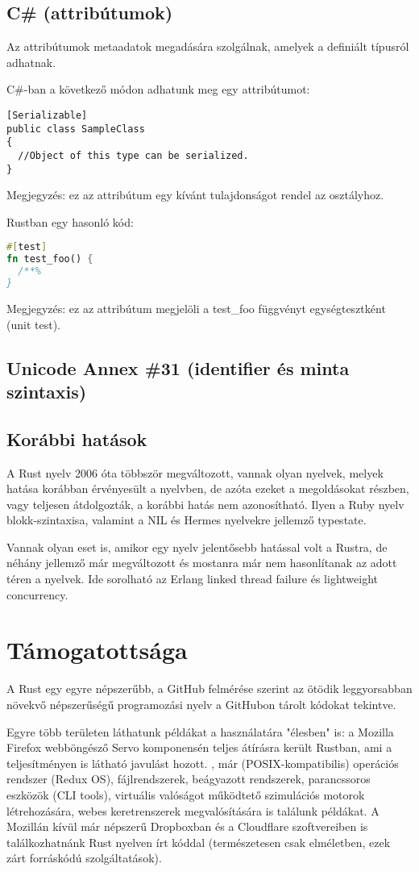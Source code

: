 \subsection{C\# (attribútumok)}

Az attribútumok metaadatok megadására szolgálnak, amelyek a definiált típusról adhatnak.

C\#-ban a következő módon adhatunk meg egy attribútumot:
\begin{lstlisting}
[Serializable]
public class SampleClass
{
  //Object of this type can be serialized.
}
\end{lstlisting}
Megjegyzés: ez az attribútum egy kívánt tulajdonságot rendel az osztályhoz.

Rustban egy hasonló kód:
\begin{lstlisting}[language=Rust, style=boxed]
#[test]
fn test_foo() {
  /**%
}
\end{lstlisting}
Megjegyzés: ez az attribútum megjelöli a test\_foo függvényt egységtesztként (unit test).

\subsection{Unicode Annex \#31 (identifier és minta szintaxis)}

\subsection{Korábbi hatások}
A Rust nyelv 2006 óta többször megváltozott, vannak olyan nyelvek, melyek hatása korábban érvényesült a nyelvben, de azóta ezeket a megoldásokat részben, vagy teljesen átdolgozták, a korábbi hatás nem azonosítható. Ilyen a Ruby nyelv blokk-szintaxisa, valamint a NIL és Hermes nyelvekre jellemző typestate.

Vannak olyan eset is, amikor egy nyelv jelentősebb hatással volt a Rustra, de néhány jellemző már megváltozott és mostanra már nem hasonlítanak az adott téren a nyelvek. Ide sorolható az Erlang linked thread failure és lightweight concurrency.

\section{Támogatottsága}
A Rust egy egyre népszerűbb, a GitHub felmérése szerint %
az ötödik leggyorsabban növekvő népszerűségű programozási nyelv a GitHubon tárolt kódokat tekintve.

Egyre több területen láthatunk példákat a használatára "élesben" is: a Mozilla Firefox webböngésző Servo komponensén teljes átírásra került Rustban, ami a teljesítményen is látható javulást hozott. %
, már (POSIX-kompatibilis) operációs rendszer (Redux OS), fájlrendszerek, beágyazott rendszerek, parancssoros eszközök (CLI tools), virtuális valóságot működtető szimulációs motorok létrehozására, webes keretrenszerek megvalósítására is találunk példákat. %
A Mozillán kívül már népszerű Dropboxban és a Cloudflare szoftvereiben is találkozhatnánk Rust nyelven írt kóddal (természetesen csak elméletben, ezek zárt forráskódú szolgáltatások).
